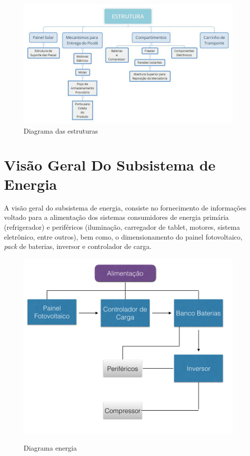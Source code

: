 \begin{figure}[H]
	\centering
    
    \includegraphics[width=\textwidth]{figuras/Vis_o_Geral_-_ESTRUTURA}
    \caption{Diagrama das estruturas}
    \label{fig:Vis_o_Geral_-_ESTRUTURA}
\end{figure}

\section{Visão Geral Do Subsistema de Energia}

	A visão geral do subsistema de energia, consiste no fornecimento de informações voltado para a alimentação dos sistemas consumidores de energia primária (refrigerador) e periféricos (iluminação, carregador de tablet, motores, sistema eletrônico, entre outros), bem como, o dimensionamento do painel fotovoltaico,  \textit{pack} de baterias, inversor e controlador de carga. 
   
  \begin{figure}[H]
	\centering
    
    \includegraphics[scale=0.8]{figuras/diagrama_energia}
    \label{fig:diagrama_energia}
    \caption{Diagrama energia}
\end{figure}

